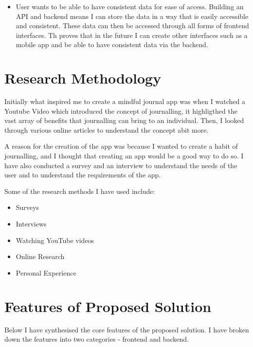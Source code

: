 \begin{itemize}

            \item User wants to be able to have consistent data for ease of access. Building an API and backend means I can store the data in a way that is easily accessible and consistent. These data can then be accessed through all forms of frontend interfaces. Th proves that in the future I can create other interfaces such as a mobile app and be able to have consistent data via the backend.

    \end{itemize}




\section{Research Methodology}
Initially what inspired me to create a mindful journal app was when I watched a Youtube Video which introduced the concept of journalling, it highligthed the vast array of benefits that journalling can bring to an individual. Then, I looked through various online articles to understand the concept abit more. 

A reason for the creation of the app was because I wanted to create a habit of journalling, and I thought that creating an app would be a good way to do so. I have also conducted a survey and an interview to understand the needs of the user and to understand the requirements of the app.

Some of the research methods I have used include:
\begin{itemize}
  \item Surveys
  \item Interviews
  \item Watching YouTube videos
  \item Online Research
  \item Personal Experience
\end{itemize}

\section{Features of Proposed Solution}
Below I have synthesised the core features of the proposed solution. I have broken down the features into two categories - frontend and backend.

